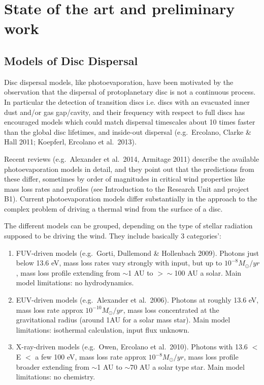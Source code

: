 \documentclass[10pt,fleqn,twoside]{article}
\begin{document}
\section{State of the art and preliminary work}
\renewcommand{\leftmark}{\sc State of the Art and preliminary work}

\subsection{Models of Disc Dispersal}

Disc dispersal models, like photoevaporation, have been motivated by
the observation that the dispersal of protoplanetary disc is
not a continuous process. In particular the detection of transition
discs i.e. discs with an evacuated inner dust
and/or gas gap/cavity, and their frequency with respect to full discs
has encouraged models which could match dispersal
timescales about 10 times faster than the global disc
lifetimes, and inside-out dispersal  (e.g.\ Ercolano, Clarke \& Hall 2011;
Koepferl, Ercolano et al.\ 2013). 

Recent reviews (e.g.\ Alexander et al.\ 2014, Armitage 2011) describe
the available photoevaporation models in detail, and they point out that the
predictions from these differ, sometimes by order of magnitudes in
critical wind properties like mass loss rates and profiles (see
Introduction to the Research Unit and project B1). Current
photoevaporation models differ
substantially in the approach to the complex problem of driving a
thermal wind from the surface of a disc. 

The different models can be grouped, depending on
the type of stellar radiation supposed to be driving the wind. They
include basically 3 categories':

\begin{enumerate}
\item FUV-driven models (e.g.\ Gorti, Dullemond \& Hollenbach
  2009). Photons just below 13.6 eV, mass loss rates vary strongly
  with input, but up to $10^{-8}M_{\odot}/yr$, mass
loss profile extending from $\sim$1 AU to  $>\sim$100 AU a
solar. Main model limitations: no hydrodynamics. 
\item EUV-driven models (e.g.\ Alexander et al.\ 2006). Photons at
  roughly 13.6 eV, mass loss rate approx $10^{-10}M_{\odot}/yr$, mass
loss concentrated at the gravitational radius (around 1AU for a solar
mass star). Main model limitations: isothermal calculation, input flux
unknown. 
\item X-ray-driven models (e.g.\ Owen, Ercolano et al.\ 2010). Photons
  with 13.6 $<$ E $<$ a few 100 eV, mass loss rate approx $10^{-8}M_{\odot}/yr$, mass
loss profile broader extending from $\sim$1 AU to  $\sim$70 AU a solar
type star. Main model limitations: no chemistry. 
\end{enumerate}
\end{document}
